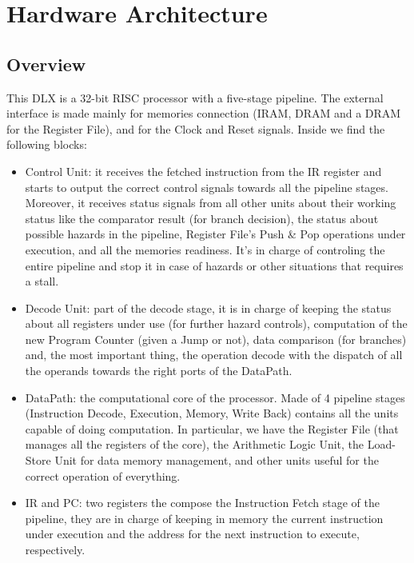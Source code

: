 
\chapter{Hardware Architecture}

\section{Overview}

This DLX is a 32-bit RISC processor with a five-stage pipeline. The external interface is made mainly for memories connection (IRAM, DRAM and a DRAM for the Register File), and for the Clock and Reset signals. Inside we find the following blocks:

\begin{itemize}
    \item Control Unit: it receives the fetched instruction from the IR register and starts to output the correct control signals towards all the pipeline stages. Moreover, it receives status signals from all other units about their working status like the comparator result (for branch decision), the status about possible hazards in the pipeline, Register File's Push \& Pop operations under execution, and all the memories readiness. It's in charge of controling the entire pipeline and stop it in case of hazards or other situations that requires a stall.
    \item Decode Unit: part of the decode stage, it is in charge of keeping the status about all registers under use (for further hazard controls), computation of the new Program Counter (given a Jump or not), data comparison (for branches) and, the most important thing, the operation decode with the dispatch of all the operands towards the right ports of the DataPath.
    \item DataPath: the computational core of the processor. Made of 4 pipeline stages (Instruction Decode, Execution, Memory, Write Back) contains all the units capable of doing computation. In particular, we have the Register File (that manages all the registers of the core), the Arithmetic Logic Unit, the Load-Store Unit for data memory management, and other units useful for the correct operation of everything.
    \item IR and PC: two registers the compose the Instruction Fetch stage of the pipeline, they are in charge of keeping in memory the current instruction under execution and the address for the next instruction to execute, respectively. 
\end{itemize}



